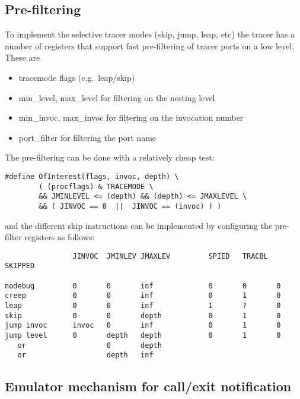 \subsection{Pre-filtering}
To implement the selective tracer modes (skip, jump, leap, etc)
the tracer has a number of registers that support fast pre-filtering
of tracer ports on a low level. These are
\begin{itemize}
\item tracemode flags (e.g.\ leap/skip)
\item min_level, max_level for filtering on the nesting level
\item min_invoc, max_invoc for filtering on the invocation number
\item port_filter for filtering the port name
\end{itemize}
The pre-filtering can be done with a relatively cheap test:
\begin{small}
\begin{verbatim}
#define OfInterest(flags, invoc, depth) \
        ( (procflags) & TRACEMODE \
        && JMINLEVEL <= (depth) && (depth) <= JMAXLEVEL \
        && ( JINVOC == 0  ||  JINVOC == (invoc) ) )
\end{verbatim}
\end{small}
and the different skip instructions can be implemented by configuring
the pre-filter registers as follows:
\begin{small}
\begin{verbatim}
                JINVOC  JMINLEV JMAXLEV         SPIED   TRACBL  SKIPPED

nodebug         0       0       inf             0       0       0
creep           0       0       inf             0       1       0
leap            0       0       inf             1       ?       0
skip            0       0       depth           0       1       0
jump invoc      invoc   0       inf             0       1       0
jump level      0       depth   depth           0       1       0
   or                   0       depth
   or                   depth   inf
\end{verbatim}
\end{small}



\subsection{Emulator mechanism for call/exit notification}


